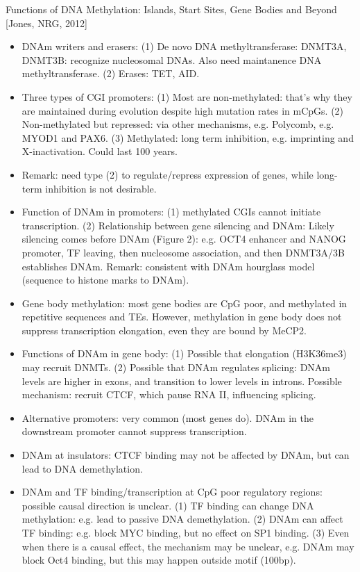 \documentclass{report}
\begin{document}
Functions of DNA Methylation: Islands, Start Sites, Gene Bodies and Beyond [Jones, NRG, 2012]
\begin{itemize}
	\item DNAm writers and erasers: (1) De novo DNA methyltransferase: DNMT3A, DNMT3B: recognize nucleosomal DNAs. Also need maintanence DNA methyltransferase. (2) Erases: TET, AID.
	
	\item Three types of CGI promoters: (1) Most are non-methylated: that’s why they are maintained during evolution despite high mutation rates in mCpGs. (2) Non-methylated but repressed: via other mechanisms, e.g. Polycomb, e.g. MYOD1 and PAX6. (3) Methylated: long term inhibition, e.g. imprinting and X-inactivation. Could last 100 years.
	
	\item Remark: need type (2) to regulate/repress expression of genes, while long-term inhibition is not desirable.
	
	\item Function of DNAm in promoters: (1) methylated CGIs cannot initiate transcription. (2) Relationship between gene silencing and DNAm: Likely silencing comes before DNAm (Figure 2): e.g. OCT4 enhancer and NANOG promoter, TF leaving, then nucleosome association, and then DNMT3A/3B establishes DNAm. Remark: consistent with DNAm hourglass model (sequence to histone marks to DNAm).
	
	\item Gene body methylation: most gene bodies are CpG poor, and methylated in repetitive sequences and TEs. However, methylation in gene body does not suppress transcription elongation, even they are bound by MeCP2.
	
	\item Functions of DNAm in gene body: (1) Possible that elongation (H3K36me3) may recruit DNMTs. (2) Possible that DNAm regulates splicing: DNAm levels are higher in exons, and transition to lower levels in introns. Possible mechanism: recruit CTCF, which pause RNA II, influencing splicing.
	
	\item Alternative promoters: very common (most genes do). DNAm in the downstream promoter cannot suppress transcription.
	
	\item DNAm at insulators: CTCF binding may not be affected by DNAm, but can lead to DNA demethylation.
	
	\item DNAm and TF binding/transcription at CpG poor regulatory regions: possible causal direction is unclear. (1) TF binding can change DNA methylation: e.g. lead to passive DNA demethylation. (2) DNAm can affect TF binding: e.g. block MYC binding, but no effect on SP1 binding. (3) Even when there is a causal effect, the mechanism may be unclear, e.g. DNAm may block Oct4 binding, but this may happen outside motif (100bp).
	
\end{itemize}
\end{document}

